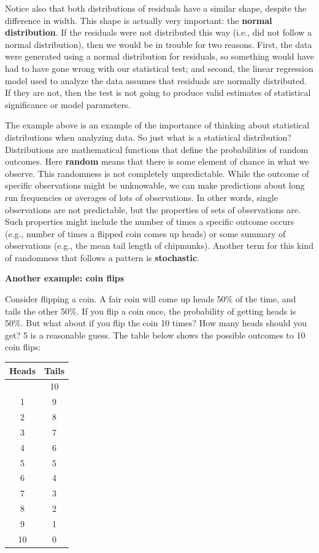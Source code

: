 \documentclass[
  13,
  letterpaper,
]{report}
\begin{document}
Notice also that both distributions of residuals have a similar shape,
despite the difference in width. This shape is actually very important:
the \textbf{normal distribution}. If the residuals were not distributed
this way (i.e., did not follow a normal distribution), then we would be
in trouble for two reasons. First, the data were generated using a
normal distribution for residuals, so something would have had to have
gone wrong with our statistical test; and second, the linear regression
model used to analyze the data assumes that residuals are normally
distributed. If they are not, then the test is not going to produce
valid estimates of statistical significance or model parameters.

The example above is an example of the importance of thinking about
statistical distributions when analyzing data. So just what is a
statistical distribution? Distributions are mathematical functions that
define the probabilities of random outcomes. Here \textbf{random} means
that there is some element of chance in what we observe. This randomness
is not completely unpredictable. While the outcome of specific
observations might be unknowable, we can make predictions about long run
frequencies or averages of lots of observations. In other words, single
observations are not predictable, but the properties of sets of
observations are. Such properties might include the number of times a
specific outcome occurs (e.g., number of times a flipped coin comes up
heads) or some summary of observations (e.g., the mean tail length of
chipmunks). Another term for this kind of randomness that follows a
pattern is \textbf{stochastic}.

\textbf{Another example: coin flips}

Consider flipping a coin. A fair coin will come up heads 50\% of the
time, and tails the other 50\%. If you flip a coin once, the probability
of getting heads is 50\%. But what about if you flip the coin 10 times?
How many heads should you get? 5 is a reasonable guess. The table below
shows the possible outcomes to 10 coin flips:

\begin{longtable}[]{@{}cc@{}}
\toprule\noalign{}
Heads & Tails \\
\midrule\noalign{}
\endhead
\bottomrule\noalign{}
\endlastfoot
0 & 10 \\
1 & 9 \\
2 & 8 \\
3 & 7 \\
4 & 6 \\
5 & 5 \\
6 & 4 \\
7 & 3 \\
8 & 2 \\
9 & 1 \\
10 & 0 \\
\end{longtable}
\end{document}
